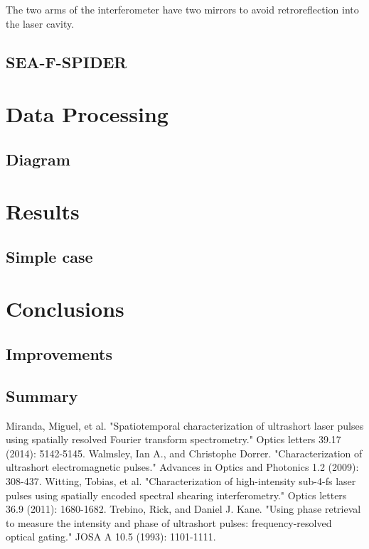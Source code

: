 \documentclass[12pt,a4paper,twoside]{article}
\begin{document}
The two arms of the interferometer have two mirrors to avoid retroreflection into the laser cavity.

\subsection{SEA-F-SPIDER}
\section{Data Processing}
\subsection{Diagram}
\section{Results}
\subsection{Simple case}
\section{Conclusions}
\subsection{Improvements}
\subsection{Summary}

\clearpage
\begin{thebibliography}{9}
 Miranda, Miguel, et al. "Spatiotemporal characterization of ultrashort laser pulses using spatially resolved Fourier transform spectrometry." Optics letters 39.17 (2014): 5142-5145.
 Walmsley, Ian A., and Christophe Dorrer. "Characterization of ultrashort electromagnetic pulses." Advances in Optics and Photonics 1.2 (2009): 308-437.
 Witting, Tobias, et al. "Characterization of high-intensity sub-4-fs laser pulses using spatially encoded spectral shearing interferometry." Optics letters 36.9 (2011): 1680-1682.
 Trebino, Rick, and Daniel J. Kane. "Using phase retrieval to measure the intensity and phase of ultrashort pulses: frequency-resolved optical gating." JOSA A 10.5 (1993): 1101-1111.


\end{thebibliography}
\end{document}
